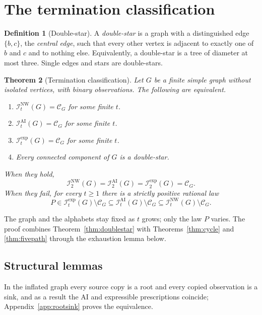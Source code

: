\documentclass[11pt]{article}
\theoremstyle{plain}
\newtheorem{theorem}{Theorem}[section]
\theoremstyle{definition}
\newtheorem{definition}[theorem]{Definition}
\newcommand{\INW}{\mathcal I^{\mathrm{NW}}}
\newcommand{\IAI}{\mathcal I^{\mathrm{AI}}}
\newcommand{\Iexp}{\mathcal I^{\mathrm{exp}}}
\begin{document}
\section{The termination classification}\label{sec:classification}

\providecommand{\Cscen}[1]{\mathcal C_{#1}}


\begin{definition}[Double-star]\label{def:doublestar}
A \emph{double-star} is a graph with a distinguished edge $\{b,c\}$, the \emph{central edge}, such that every other vertex is adjacent to exactly one of $b$ and $c$ and to nothing else. Equivalently, a double-star is a tree of diameter at most three. Single edges and stars are double-stars.
\end{definition}

\begin{theorem}[Termination classification]\label{thm:classification}\label{thm:classification-intro}
Let $G$ be a finite simple graph without isolated vertices, with binary observations. The following are equivalent.
\begin{enumerate}[label=(\alph*),nosep]
\item $\INW_t(G)=\Cscen{G}$ for some finite $t$.
\item $\IAI_t(G)=\Cscen{G}$ for some finite $t$.
\item $\Iexp_t(G)=\Cscen{G}$ for some finite $t$.
\item Every connected component of $G$ is a double-star.
\end{enumerate}
When they hold,
\[
\INW_2(G)=\IAI_2(G)=\Iexp_2(G)=\Cscen{G}.
\]
When they fail, for every $t\ge1$ there is a strictly positive rational law
\[
P\in\Iexp_t(G)\setminus\Cscen{G}\subseteq\IAI_t(G)\setminus\Cscen{G}\subseteq\INW_t(G)\setminus\Cscen{G}.
\]
\end{theorem}

The graph and the alphabets stay fixed as $t$ grows; only the law $P$ varies. The proof combines Theorem~\ref{thm:doublestar} with Theorems~\ref{thm:cycle} and \ref{thm:fivepath} through the exhaustion lemma below.

\subsection{Structural lemmas}

In the inflated graph every source copy is a root and every copied observation is a sink, and as a result the AI and expressible prescriptions coincide; Appendix~\ref{app:rootsink} proves the equivalence.
\end{document}
